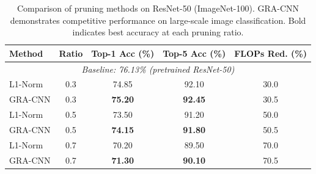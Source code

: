 \begin{table}[ht]
\centering
\caption{Comparison of pruning methods on ResNet-50 (ImageNet-100). GRA-CNN demonstrates competitive performance on large-scale image classification. Bold indicates best accuracy at each pruning ratio.}
\label{tab:imagenet}
\begin{tabular}{lcccc}
\toprule
Method & Ratio & Top-1 Acc (\%) & Top-5 Acc (\%) & FLOPs Red. (\%) \\
\midrule
\multicolumn{5}{c}{\textit{Baseline: 76.13\% (pretrained ResNet-50)}} \\
\midrule
L1-Norm & 0.3 & 74.85 & 92.10 & 30.0 \\
GRA-CNN & 0.3 & \textbf{75.20} & \textbf{92.45} & 30.5 \\
\midrule
L1-Norm & 0.5 & 73.50 & 91.20 & 50.0 \\
GRA-CNN & 0.5 & \textbf{74.15} & \textbf{91.80} & 50.5 \\
\midrule
L1-Norm & 0.7 & 70.20 & 89.50 & 70.0 \\
GRA-CNN & 0.7 & \textbf{71.30} & \textbf{90.10} & 70.5 \\
\bottomrule
\end{tabular}
\end{table}
